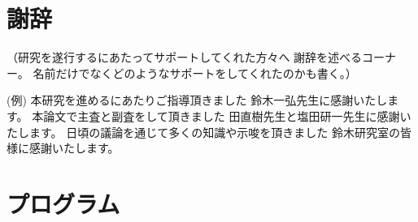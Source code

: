 \documentclass[12pt,a4paper,oneside]{jsbook}
\theoremstyle{plain}
\begin{document}
\chapter*{謝辞}
（研究を遂行するにあたってサポートしてくれた方々へ
謝辞を述べるコーナー。
名前だけでなくどのようなサポートをしてくれたのかも書く。）

(例)
本研究を進めるにあたりご指導頂きました
鈴木一弘先生に感謝いたします。
本論文で主査と副査をして頂きました
田直樹先生と塩田研一先生に感謝いたします。
日頃の議論を通じて多くの知識や示唆を頂きました
鈴木研究室の皆様に感謝いたします。



\appendix
\chapter{プログラム}
\label{program}


\end{document}
